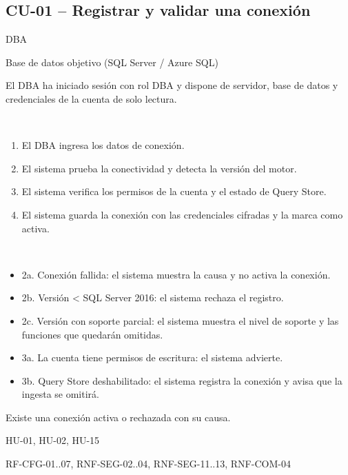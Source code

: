 \documentclass[11pt,a4paper]{report}
\begin{document}
\subsection{CU-01 -- Registrar y validar una conexión}
\begin{description}[leftmargin=3.3cm,style=nextline]
\item[Actor principal] DBA
\item[Actor secundario] Base de datos objetivo (SQL Server / Azure SQL)
\item[Precondiciones] El DBA ha iniciado sesión con rol DBA y dispone de servidor, base de datos y credenciales de la cuenta de solo lectura.
\item[Flujo principal]~
\begin{enumerate}[leftmargin=1.3em,itemsep=1pt]
\item El DBA ingresa los datos de conexión.
\item El sistema prueba la conectividad y detecta la versión del motor.
\item El sistema verifica los permisos de la cuenta y el estado de Query Store.
\item El sistema guarda la conexión con las credenciales cifradas y la marca como activa.
\end{enumerate}
\item[Flujos alternos]~
\begin{itemize}[leftmargin=1.3em,itemsep=1pt]
\item 2a. Conexión fallida: el sistema muestra la causa y no activa la conexión.
\item 2b. Versión < SQL Server 2016: el sistema rechaza el registro.
\item 2c. Versión con soporte parcial: el sistema muestra el nivel de soporte y las funciones que quedarán omitidas.
\item 3a. La cuenta tiene permisos de escritura: el sistema advierte.
\item 3b. Query Store deshabilitado: el sistema registra la conexión y avisa que la ingesta se omitirá.
\end{itemize}
\item[Postcondici\'on] Existe una conexión activa o rechazada con su causa.
\item[Historias relacionadas] HU-01, HU-02, HU-15
\item[Requisitos relacionados] RF-CFG-01..07, RNF-SEG-02..04, RNF-SEG-11..13, RNF-COM-04
\end{description}
\end{document}

